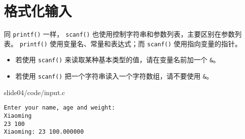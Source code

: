 \section{格式化输入}
\begin{frame}[fragile]\ft{\secname}
  同 \lstinline|printf()| 一样， \lstinline|scanf()| 也使用控制字符串和参数列表，主要区别在参数列表。 \lstinline|printf()| 使用变量名、常量和表达式；而 \lstinline|scanf()| 使用指向变量的指针。

  \vspace{.1in}\pause 

  \begin{itemize}
\item 
  若使用 \lstinline|scanf()| 来读取某种基本类型的值，请在变量名前加一个 \lstinline|&|。 \\[0.1in]
\item
  若使用 \lstinline|scanf()| 把一个字符串读入一个字符数组，请不要使用 \lstinline|&|。
\end{itemize}
\end{frame}

\begin{frame}[fragile]
  
  {slide04/code/input.c}
\end{frame}

\begin{frame}[fragile]
\begin{lstlisting}[showspaces=true,backgroundcolor=\color{red!20}]
Enter your name, age and weight:
Xiaoming
23 100
Xiaoming: 23 100.000000
\end{lstlisting}
\end{frame}

